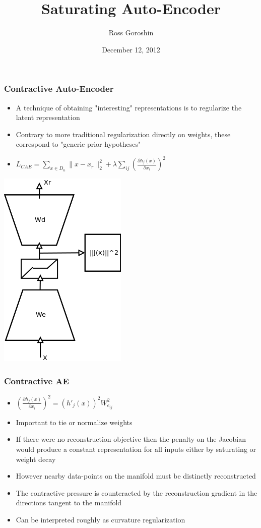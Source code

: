\documentclass{beamer}
\title{Saturating Auto-Encoder}
\date{December 12, 2012}
\author{Ross Goroshin}
\begin{document}
\begin{frame} 
\frametitle{Contractive Auto-Encoder}
\begin{itemize}
\item{A technique of obtaining "interesting" representations is to regularize the latent representation}
\item{Contrary to more traditional regularization directly on weights, these correspond to "generic prior hypotheses"}
\item{$L_{CAE} = \sum_{x \in D_n} \|x-x_r\|_2 ^2 + \lambda \sum_{ij} \left(\frac{\partial h_j(x)}{\partial x_i} \right)^2$ }
\end{itemize} 
\begin{center}
\includegraphics[scale = 0.4]{CAE.png} 
\end{center} 
\end{frame} 

\begin{frame}
\frametitle{Contractive AE} 
\begin{itemize}
\item{$\left(\frac{\partial h_j(x)}{\partial x_i}\right)^2 = (h'_j(x))^2 W_{e_{ij}}^2$}
\item{Important to tie or normalize weights}
\item{If there were no reconstruction objective then the penalty on the Jacobian would produce a constant representation for all inputs either by saturating or weight decay} 
\item{However nearby data-points on the manifold must be distinctly reconstructed}
\item{The contractive pressure is counteracted by the reconstruction gradient in the directions tangent to the manifold}
\item{Can be interpreted roughly as curvature regularization}
\end{itemize} 
\end{frame} 
\end{document}
